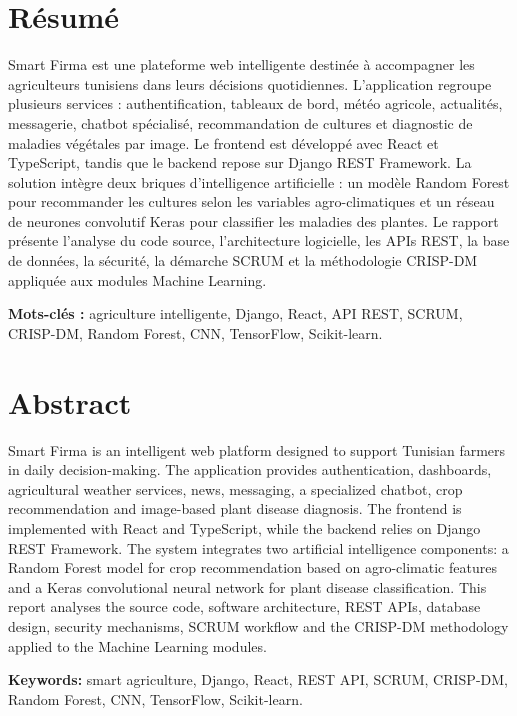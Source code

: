 \documentclass[12pt,a4paper]{report}
\begin{document}
\chapter*{Résumé}
Smart Firma est une plateforme web intelligente destinée à accompagner les agriculteurs tunisiens dans leurs décisions quotidiennes. L'application regroupe plusieurs services : authentification, tableaux de bord, météo agricole, actualités, messagerie, chatbot spécialisé, recommandation de cultures et diagnostic de maladies végétales par image. Le frontend est développé avec React et TypeScript, tandis que le backend repose sur Django REST Framework. La solution intègre deux briques d'intelligence artificielle : un modèle Random Forest pour recommander les cultures selon les variables agro-climatiques et un réseau de neurones convolutif Keras pour classifier les maladies des plantes. Le rapport présente l'analyse du code source, l'architecture logicielle, les APIs REST, la base de données, la sécurité, la démarche SCRUM et la méthodologie CRISP-DM appliquée aux modules Machine Learning.

\textbf{Mots-clés :} agriculture intelligente, Django, React, API REST, SCRUM, CRISP-DM, Random Forest, CNN, TensorFlow, Scikit-learn.

\chapter*{Abstract}
Smart Firma is an intelligent web platform designed to support Tunisian farmers in daily decision-making. The application provides authentication, dashboards, agricultural weather services, news, messaging, a specialized chatbot, crop recommendation and image-based plant disease diagnosis. The frontend is implemented with React and TypeScript, while the backend relies on Django REST Framework. The system integrates two artificial intelligence components: a Random Forest model for crop recommendation based on agro-climatic features and a Keras convolutional neural network for plant disease classification. This report analyses the source code, software architecture, REST APIs, database design, security mechanisms, SCRUM workflow and the CRISP-DM methodology applied to the Machine Learning modules.

\textbf{Keywords:} smart agriculture, Django, React, REST API, SCRUM, CRISP-DM, Random Forest, CNN, TensorFlow, Scikit-learn.
\end{document}
